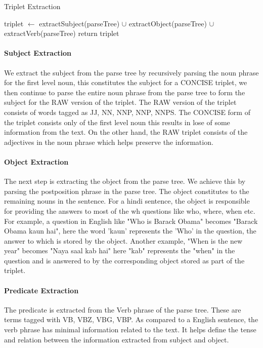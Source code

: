 \begin {algorithm}
\caption {Triplet Extraction}
\begin {algorithmic}[1]
\State triplet $\gets$ extractSubject(parseTree) $\cup$ extractObject(parseTree) $\cup$ extractVerb(parseTree)
\State return triplet
\EndProcedure		
\end {algorithmic}
\end {algorithm}

\paragraph{Subject Extraction}
We extract the subject from the parse tree by recursively parsing the noun phrase for the first level noun, this constitutes the subject for a CONCISE triplet, we then continue to parse the entire noun phrase from the parse tree to form the subject for the RAW version of the triplet. The RAW version of the triplet consists of words tagged as JJ, NN, NNP, NNP, NNPS. The CONCISE form of the triplet consists only of the first level noun this results in lose of some information from the text. On the other hand, the RAW triplet consists of the adjectives in the noun phrase which helps preserve the information.

\paragraph{Object Extraction}
The next step is extracting the object from the parse tree. We achieve this by parsing the postposition phrase in the parse tree. The object constitutes to the remaining nouns in the sentence. For a hindi sentence, the object is responsible for providing the answers to most of the wh questions like who, where, when etc. For example, a question in English like "Who is Barack Obama"  becomes "Barack Obama kaun hai", here the word 'kaun' represents the 'Who' in the question, the answer to which is stored by the object. Another example, "When is the new year" becomes "Naya saal kab hai"  here "kab" represents the "when" in the question and is answered to by the corresponding object stored as part of the triplet.

\paragraph{Predicate Extraction}
The predicate is extracted from the Verb phrase of the parse tree. These are terms tagged with VB, VBZ, VBG, VBP. As compared to a English sentence, the verb phrase has minimal information related to the text. It helps define the tense and relation between the information extracted from subject and object.

